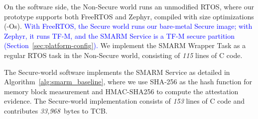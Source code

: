\documentclass[journal]{IEEEtran}
\newcommand\ben[1]{\textcolor{blue}{#1}}
\begin{document}
On the software side, the Non-Secure world runs an unmodified RTOS, where our prototype supports both FreeRTOS and Zephyr, compiled with size optimizations (-Os).
\ben{With FreeRTOS, the Secure world runs our bare-metal Secure image; with Zephyr, it runs TF-M, and the SMARM Service is a TF-M secure partition (Section~\ref{sec:platform-config}).}
We implement the SMARM Wrapper Task as a regular RTOS task in the Non-Secure world, consisting of \textit{115} lines of C code.
%


The Secure-world software implements the SMARM Service as detailed 
in Algorithm~\ref{alg:smarm_baseline}, where we use SHA-256 as the 
hash function for memory block measurement and HMAC-SHA256 to compute 
the attestation evidence. The Secure-world implementation consists of 
\textit{153} lines of C code and contributes \textit{33{,}968}~bytes 
to TCB.
\end{document}
